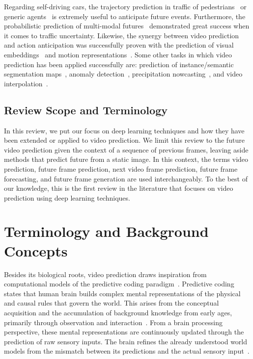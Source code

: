Regarding self-driving cars, the trajectory prediction in traffic of pedestrians~\cite{Bhattacharyya2018} or generic agents~\cite{Choi2020} is extremely useful to anticipate future events. Furthermore, the probabilistic prediction of multi-modal futures~\cite{Hu2020} demonstrated great success when it comes to traffic uncertainty. Likewise, the synergy between video prediction and action anticipation was successfully proven with the prediction of visual embeddings~\cite{Gammulle2019} and motion representations~\cite{Opazo2018}. Some other tasks in which video prediction has been applied successfully are: prediction of instance/semantic segmentation maps~\cite{Luc2018,Bhattacharyya2019,Terwilliger2019}, anomaly detection~\cite{Liu2018a}, precipitation nowcasting~\cite{Shi2015,Shi2017}, and video interpolation~\cite{Liu2017}.

\subsection{Review Scope and Terminology}
In this review, we put our focus on deep learning techniques and how they have been extended or applied to video prediction. We limit this review to the future video prediction given the  context of a sequence of previous frames, leaving aside methods that predict future from a static image. In this context, the terms
video prediction, future frame prediction, next video frame prediction, future frame forecasting, and future frame generation are used interchangeably. To the best of our knowledge, this is the first review in the literature that focuses on video prediction using deep learning techniques.


\section{Terminology and Background Concepts}
\label{sec:video_prediction}
Besides its biological roots, video prediction draws inspiration from computational models of the predictive coding paradigm~\cite{Softky1995,Rao1999,Deco2001,Hollingworth2004}. Predictive coding states that human brain builds complex mental representations of the physical and causal rules that govern the world. This arises from the conceptual acquisition and the accumulation of background knowledge from early ages, primarily through observation and interaction~\cite{Cleeremans1991,Cleeremans1993,Baker2014}. From a brain processing perspective, these mental representations are continuously updated through the prediction of raw sensory inputs. The brain refines the already understood world models from the mismatch between its predictions and the actual sensory input~\cite{Ouden2012}.

